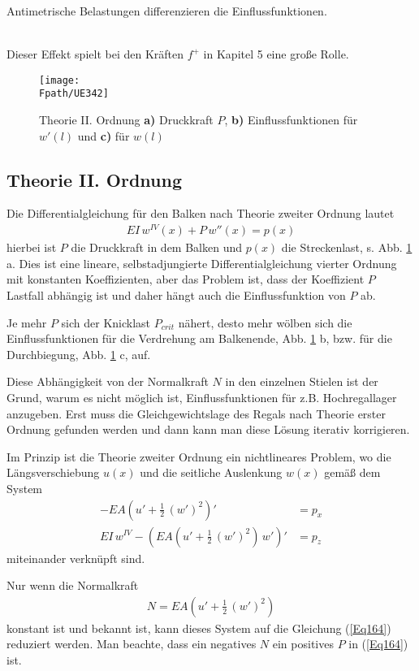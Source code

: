\hspace*{-12pt}\colorbox{highlightBlue}{\parbox{0.98\textwidth}{Antimetrische Belastungen \glq differenzieren\grq{} die Einflussfunktionen.}}\\

Dieser Effekt spielt bei den Kr\"{a}ften $f^+ $ in Kapitel 5 eine gro{\ss}e Rolle.

\begin{figure}[tbp]
\centering
\if {} \sidecaption \fi
\texttt{[image: \\Fpath/UE342]}
\caption{Theorie II. Ordnung {\bf a)} Druckkraft $P$, {\bf b)} Einflussfunktionen f\"{u}r $w'(l)$ und {\bf c)} f\"{u}r $w(l)$} \label{UE342}
\end{figure}%

{\textcolor{sectionTitleBlue}{\section{Theorie II. Ordnung}}}
Die Differentialgleichung f\"{u}r den Balken nach Theorie zweiter Ordnung lautet
\begin{align}\label{Eq164}
EI\,w^{IV}(x) + P\,w''(x) = p(x)
\end{align}
hierbei ist  $P$ die Druckkraft in dem Balken und $p(x)$ die Streckenlast, s. Abb. \ref{UE342} a. Dies ist eine lineare, selbstadjungierte Differentialgleichung vierter Ordnung mit konstanten Koeffizienten, aber das Problem ist, dass der Koeffizient $P$ Lastfall abh\"{a}ngig ist und daher h\"{a}ngt auch die Einflussfunktion von $P$ ab.

Je mehr $P$ sich der Knicklast $P_{crit}$ n\"{a}hert, desto mehr w\"{o}lben sich die Einflussfunktionen f\"{u}r die Verdrehung am Balkenende, Abb. \ref{UE342} b,  bzw. f\"{u}r die Durchbiegung, Abb. \ref{UE342} c, auf.

Diese Abh\"{a}ngigkeit von der Normalkraft $N$ in den einzelnen Stielen ist der Grund, warum es nicht m\"{o}glich ist, Einflussfunktionen f\"{u}r z.B. Hochregallager anzugeben. Erst muss die Gleichgewichtslage des Regals nach Theorie erster Ordnung gefunden werden und dann kann man diese L\"{o}sung iterativ korrigieren.

Im Prinzip ist die Theorie zweiter Ordnung ein nichtlineares Problem, wo die L\"{a}ngsverschiebung $u(x)$ und die seitliche Auslenkung $w(x)$ gem\"{a}{\ss} dem System
\begin{subequations}
\begin{align}
- EA \left(u' + \frac{1}{2}\, (w')^2\right)' &= p_x \\
EI\,w^{IV} - \left(EA (u' + \frac{1}{2}\, (w')^2)\,w'\right)' &= p_z
\end{align}
\end{subequations}
miteinander verkn\"{u}pft sind.

Nur wenn die Normalkraft
\begin{align}
N = EA (u' + \frac{1}{2}\, (w')^2)
\end{align}
konstant ist und bekannt ist, kann dieses System auf die Gleichung (\ref{Eq164}) reduziert werden. Man beachte, dass ein negatives $N$ ein positives $P$ in (\ref{Eq164}) ist.


